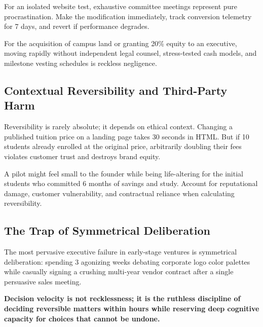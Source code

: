 For an isolated website test, exhaustive committee meetings represent pure procrastination. Make the modification immediately, track conversion telemetry for 7 days, and revert if performance degrades.

For the acquisition of campus land or granting 20\% equity to an executive, moving rapidly without independent legal counsel, stress-tested cash models, and milestone vesting schedules is reckless negligence.

\subsection{Contextual Reversibility and Third-Party Harm}

Reversibility is rarely absolute; it depends on ethical context. Changing a published tuition price on a landing page takes 30 seconds in HTML. But if 10 students already enrolled at the original price, arbitrarily doubling their fees violates customer trust and destroys brand equity.

A pilot might feel small to the founder while being life-altering for the initial students who committed 6 months of savings and study. Account for reputational damage, customer vulnerability, and contractual reliance when calculating reversibility.

\subsection{The Trap of Symmetrical Deliberation}

The most pervasive executive failure in early-stage ventures is symmetrical deliberation: spending 3 agonizing weeks debating corporate logo color palettes while casually signing a crushing multi-year vendor contract after a single persuasive sales meeting.

\textbf{Decision velocity is not recklessness; it is the ruthless discipline of deciding reversible matters within hours while reserving deep cognitive capacity for choices that cannot be undone.}
